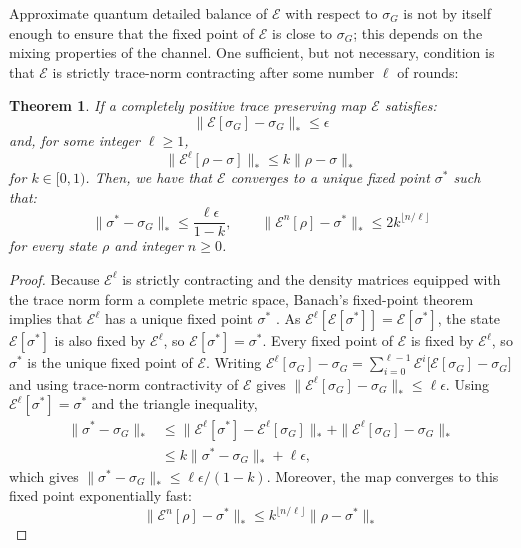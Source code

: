 \documentclass[aps,floatfix,10pt,amssymb,amsfont,amsmath,superscriptaddress,float,nofootinbib,longbibliography,nobalancelastpage,twocolumn]{revtex4-2}
\newtheorem{theorem}{Theorem}
\begin{document}
Approximate quantum detailed balance of $\mathcal{E}$ with respect to $\sigma_G$ is not by itself enough to ensure that the fixed point of $\mathcal{E}$ is close to $\sigma_G$; this depends on the mixing properties of the channel. One sufficient, but not necessary, condition is that $\mathcal{E}$ is strictly trace-norm contracting after some number $\ell$ of rounds:
 \begin{theorem}
     If a completely positive trace preserving map $\mathcal{E}$ satisfies:
     \begin{equation}
         \|\mathcal{E}[\sigma_G] - \sigma_G\|_* \leq \epsilon
     \end{equation}
     and, for some integer $\ell\geq1$,
 \begin{equation}
     \|\mathcal{E}^{\ell}[\rho-\sigma]\|_* \leq k\|\rho-\sigma\|_*
 \end{equation}
for $k \in [0,1)$. Then, we have that $\mathcal{E}$ converges to a unique fixed point $\sigma^*$ such that:
 \begin{equation}
     \| \sigma^* -\sigma_G\|_* \leq \frac{\ell\epsilon}{1-k},
     \qquad
     \|\mathcal{E}^n[\rho] -\sigma^*\|_* \leq 2k^{\lfloor n/\ell\rfloor}
 \end{equation}
 for every state $\rho$ and integer $n\geq0$.
 \label{theorem:error_bound}
 \end{theorem}
 \begin{proof}
Because $\mathcal{E}^{\ell}$ is strictly contracting and the density matrices equipped with the trace norm form a complete metric space, Banach's fixed-point theorem implies that $\mathcal{E}^{\ell}$ has a unique fixed point $\sigma^*$ \cite{Mart_nez_Pe_a_2023,Raginsky_2002}. As $\mathcal{E}^{\ell}[\mathcal{E}[\sigma^*]]=\mathcal{E}[\sigma^*]$, the state $\mathcal{E}[\sigma^*]$ is also fixed by $\mathcal{E}^{\ell}$, so $\mathcal{E}[\sigma^*]=\sigma^*$. Every fixed point of $\mathcal{E}$ is fixed by $\mathcal{E}^{\ell}$, so $\sigma^*$ is the unique fixed point of $\mathcal{E}$. Writing $\mathcal{E}^{\ell}[\sigma_G]-\sigma_G=\sum_{i=0}^{\ell-1}\mathcal{E}^{i}\big[\mathcal{E}[\sigma_G]-\sigma_G\big]$ and using trace-norm contractivity of $\mathcal{E}$ gives $\|\mathcal{E}^{\ell}[\sigma_G]-\sigma_G\|_*\leq\ell\epsilon$. Using $\mathcal{E}^{\ell}[\sigma^*]=\sigma^*$ and the triangle inequality,
\begin{align}
 \|\sigma^*-\sigma_G\|_*
 &\leq \|\mathcal{E}^{\ell}[\sigma^*]-\mathcal{E}^{\ell}[\sigma_G]\|_*+\|\mathcal{E}^{\ell}[\sigma_G]-\sigma_G\|_*\\
 &\leq k\|\sigma^*-\sigma_G\|_*+\ell\epsilon,
\end{align}
which gives $\|\sigma^*-\sigma_G\|_*\leq\ell\epsilon/(1-k)$. Moreover, the map converges to this fixed point exponentially fast:
\begin{equation}
     \|\mathcal{E}^n[\rho] -\sigma^*\|_* \leq k^{\lfloor n/\ell\rfloor}\| \rho - \sigma^*\|_*
\end{equation}
 \end{proof}
 
\end{document}
